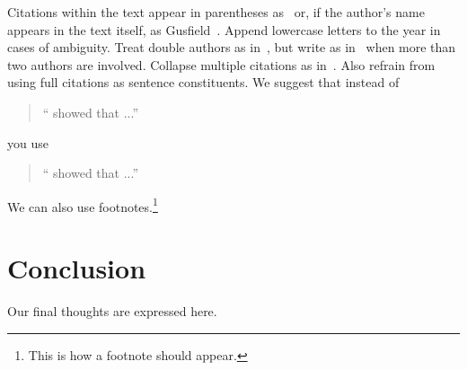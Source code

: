 \documentclass[11pt]{article}
\begin{document}
Citations within the text appear
in parentheses as~\cite{Gusfield:97} or, if the author's name appears in
the text itself, as Gusfield~. 
Append lowercase letters to the year in cases of ambiguity.  
Treat double authors as in~\cite{Aho:72}, but write as
 in~\cite{Chandra:81} when more than two authors are involved. Collapse multiple citations as
in~\cite{Gusfield:97,Aho:72}. Also refrain from using full citations as sentence constituents. We
suggest that instead of
\begin{quote}
  ``\cite{Gusfield:97} showed that ...''
\end{quote}
you use
\begin{quote}
`` showed that ...''
\end{quote}

We can also use footnotes.\footnote{This is how a footnote should appear.}

\section{Conclusion}

Our final thoughts are expressed here.



\end{document}
